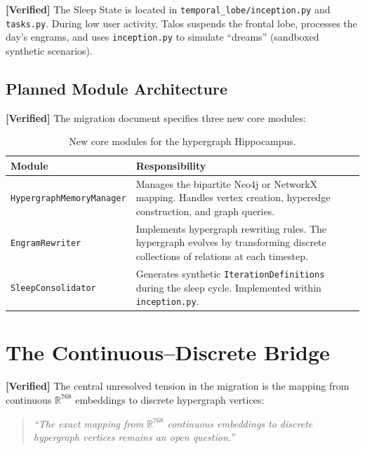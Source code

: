 \documentclass[11pt]{article}
\newcommand{\verified}{\textcolor{verifiedgreen}{\textbf{[Verified]}}}
\theoremstyle{definition}
\theoremstyle{remark}
\begin{document}
\noindent
\verified{} The Sleep State is located in \texttt{temporal\_lobe/inception.py}
and \texttt{tasks.py}. During low user activity, Talos suspends the frontal
lobe, processes the day's engrams, and uses \texttt{inception.py} to simulate
``dreams'' (sandboxed synthetic scenarios).

\subsection{Planned Module Architecture}

\verified{} The migration document specifies three new core modules:

\begin{table}[h]
\centering
\begin{tabular}{@{}lp{9cm}@{}}
\toprule
\textbf{Module} & \textbf{Responsibility} \\
\midrule
\texttt{HypergraphMemoryManager} &
  Manages the bipartite Neo4j or NetworkX mapping. Handles vertex
  creation, hyperedge construction, and graph queries. \\[0.5em]
\texttt{EngramRewriter} &
  Implements hypergraph rewriting rules. The hypergraph evolves by
  transforming discrete collections of relations at each timestep. \\[0.5em]
\texttt{SleepConsolidator} &
  Generates synthetic \texttt{IterationDefinitions} during the sleep
  cycle. Implemented within \texttt{inception.py}. \\
\bottomrule
\end{tabular}
\caption{New core modules for the hypergraph Hippocampus.}
\label{tab:new-modules}
\end{table}

\section{The Continuous--Discrete Bridge}
\label{sec:bridge}

\verified{} The central unresolved tension in the migration is the mapping from
continuous $\mathbb{R}^{768}$ embeddings to discrete hypergraph vertices:

\begin{quote}
\itshape
``The exact mapping from $\mathbb{R}^{768}$ continuous embeddings to discrete
hypergraph vertices remains an open question.''
\end{quote}
\end{document}
